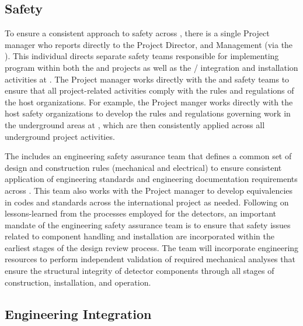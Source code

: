 \subsection{Safety}
\label{sec:dune_safety}

To ensure a consistent approach to safety across ,
there is a single Project  manager who reports directly to
the  Project Director,  and 
Management (via the  ).  This individual
directs separate safety teams responsible for implementing   program within both the  and
 projects as well as the /
integration and installation activities at .  The Project
 manager works directly with the  and  safety
teams to ensure that all project-related activities comply with the
rules and regulations of the host organizations.  For example, the
Project  manger works directly with the host safety
organizations to develop the rules and regulations governing work in
the underground areas at , which are then consistently applied
across all underground project activities.

The  includes an engineering safety assurance team that
defines a common set of design and construction rules (mechanical and
electrical) to ensure consistent application of engineering standards
and engineering documentation requirements across .
This team also works with the Project  manager to develop
equivalencies in codes and standards across the international project
as needed.  Following on lessons-learned from the processes employed
for the  detectors, an important mandate of the
engineering safety assurance team is to ensure that safety issues
related to component handling and installation are incorporated within
the earliest stages of the design review process.  The 
team will incorporate engineering resources to perform independent
validation of required mechanical analyses that ensure the structural
integrity of detector components through all stages of construction,
installation, and operation.

\subsection{Engineering Integration}
\label{sec:dune_engineering}


